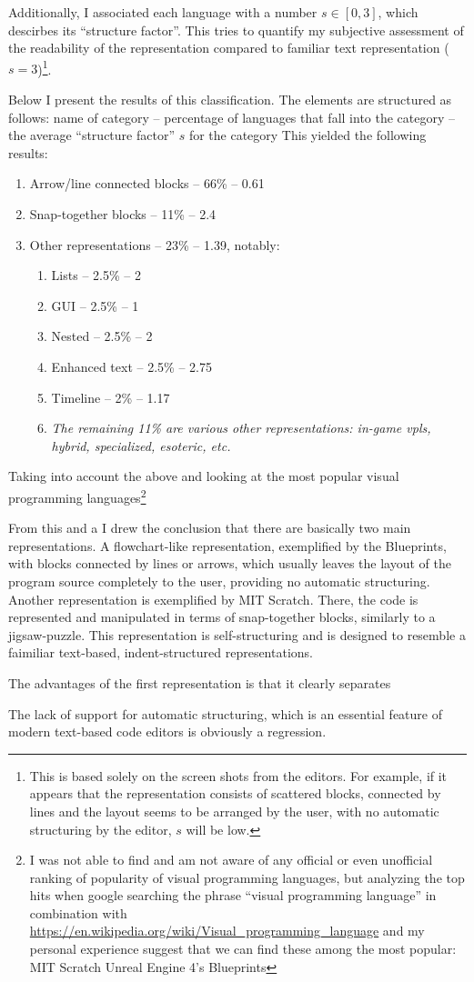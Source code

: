 Additionally, I associated each language with a number $s \in [0, 3]$, which descirbes its ``structure factor''. This tries to quantify my subjective assessment of the readability of the representation compared to familiar text representation ($s = 3$)\footnote{This is based solely on the screen shots from the editors. For example, if it appears that the representation consists of scattered blocks, connected by lines and the layout seems to be arranged by the user, with no automatic structuring by the editor, $s$ will be low.}.

Below I present the results of this classification. The elements are structured as follows: name of category -- percentage of languages that fall into the category -- the average ``structure factor'' $s$ for the category
This yielded the following results:
\begin{enumerate}
    \item Arrow/line connected blocks -- 66\% -- 0.61
    \item Snap-together blocks -- 11\% -- 2.4
    \item Other representations -- 23\% -- 1.39, notably:
    \begin{enumerate}
        \item Lists -- 2.5\% -- 2
        \item GUI -- 2.5\% -- 1
        \item Nested -- 2.5\% -- 2
        \item Enhanced text -- 2.5\% -- 2.75
        \item Timeline -- 2\% -- 1.17
        \item \textit{The remaining 11\% are various other representations: in-game \acrshort{vpl}s, hybrid, specialized, esoteric, etc.}
    \end{enumerate}
\end{enumerate}

Taking into account the above and looking at the most popular visual programming languages\footnote{I was not able to find and am not aware of any official or even unofficial ranking of popularity of visual programming languages, but analyzing the top hits when google searching the phrase ``visual programming language'' in combination with \url{https://en.wikipedia.org/wiki/Visual_programming_language} and my personal experience suggest that we can find these among the most popular:
MIT Scratch
Unreal Engine 4's Blueprints}

From this and a I drew the conclusion that there are basically two main representations. A flowchart-like representation, exemplified by the Blueprints, with blocks connected by lines or arrows, which usually leaves the layout of the program source completely to the user, providing no automatic structuring. Another representation is exemplified by MIT Scratch. There, the code is represented and manipulated in terms of snap-together blocks, similarly to a jigsaw-puzzle. This representation is self-structuring and is designed to resemble a faimiliar text-based, indent-structured representations.

The advantages of the first representation is that it clearly separates


The lack of support for automatic structuring, which is an essential feature of modern text-based code editors is obviously a regression.

